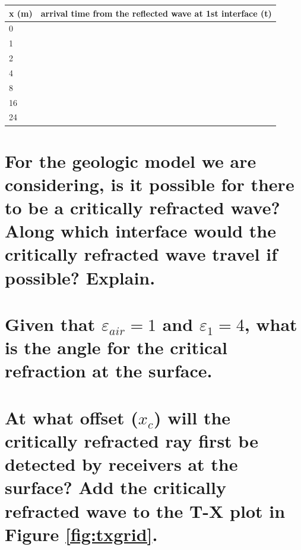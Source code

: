 \documentclass[twosides]{EOSC350Lab} %
\begin{document}
	\begin{table}[H]
	\centering
		\begin{tabular}{| l | p{3cm}|}
		\hline
		\textbf{x (m)} & arrival time from the reflected wave at 1st interface (t) \\
		\hline
		0  &  \\[2ex]
		\hline
		1  &  \\[2ex]
		\hline
		2  &  \\[2ex]
		\hline
		4  &  \\[2ex]
		\hline
		8 &  \\[2ex]
		\hline
		16 &  \\[2ex]
		\hline
		24 &  \\[2ex]
		\hline
		\end{tabular}
	\end{table}



		\part{For the geologic model we are considering, is it possible for there to be a critically refracted wave? Along which interface would the critically refracted wave travel if possible? Explain.}


			\vspace*{60pt}


		\part{Given that $\varepsilon_{air} = 1$ and $\varepsilon_1 = 4$, what is the angle for the critical refraction at the surface.}


			\vspace*{40pt}

		\part{At what offset ($x_c$) will the critically refracted ray first be detected by receivers at the surface? Add the critically refracted wave to the T-X plot in Figure \ref{fig:txgrid}.}
\end{document}
